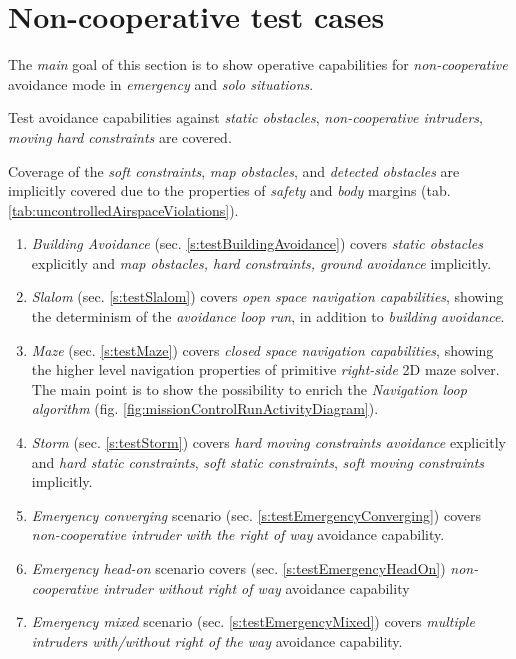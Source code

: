 \cleardoublepage
\section{Non-cooperative test cases}\label{s:noncooperativeTestCases}
    \noindent The \emph{main} goal of this section is to show operative capabilities for \emph{non-cooperative} avoidance mode in \emph{emergency} and \emph{solo situations}.  

    Test avoidance capabilities against \emph{static obstacles}, \emph{non-cooperative intruders}, \emph{moving hard constraints} are covered. 
    
    Coverage of the \emph{soft constraints}, \emph{map obstacles}, and \emph{detected obstacles} are implicitly covered due to the properties of \emph{safety} and \emph{body} margins (tab. \ref{tab:uncontrolledAirspaceViolations}).
    
    \begin{enumerate}
        \item \emph{Building Avoidance} (sec. \ref{s:testBuildingAvoidance}) covers \emph{static obstacles} explicitly and \emph{map obstacles, hard constraints, ground avoidance} implicitly.
        
        \item \emph{Slalom} (sec. \ref{s:testSlalom}) covers \emph{open space navigation capabilities}, showing the determinism of the \emph{avoidance loop run}, in addition to \emph{building avoidance}.
        
        \item \emph{Maze} (sec. \ref{s:testMaze}) covers \emph{closed space navigation capabilities}, showing the higher level navigation properties of primitive \emph{right-side} 2D maze solver. The main point is to show the possibility to enrich the \emph{Navigation loop algorithm} (fig. \ref{fig:missionControlRunActivityDiagram}).
        
        \item \emph{Storm} (sec. \ref{s:testStorm}) covers \emph{hard moving constraints avoidance} explicitly and \emph{hard static constraints}, \emph{soft static constraints}, \emph{soft moving constraints} implicitly.
        
        \item \emph{Emergency converging} scenario (sec. \ref{s:testEmergencyConverging}) covers \emph{non-cooperative intruder with the right of way} avoidance capability.
        
        \item \emph{Emergency head-on} scenario covers (sec. \ref{s:testEmergencyHeadOn}) \emph{non-cooperative intruder without right of way} avoidance capability
        
        \item \emph{Emergency mixed} scenario (sec. \ref{s:testEmergencyMixed}) covers \emph{multiple intruders with/without right of the way} avoidance capability.
    \end{enumerate}